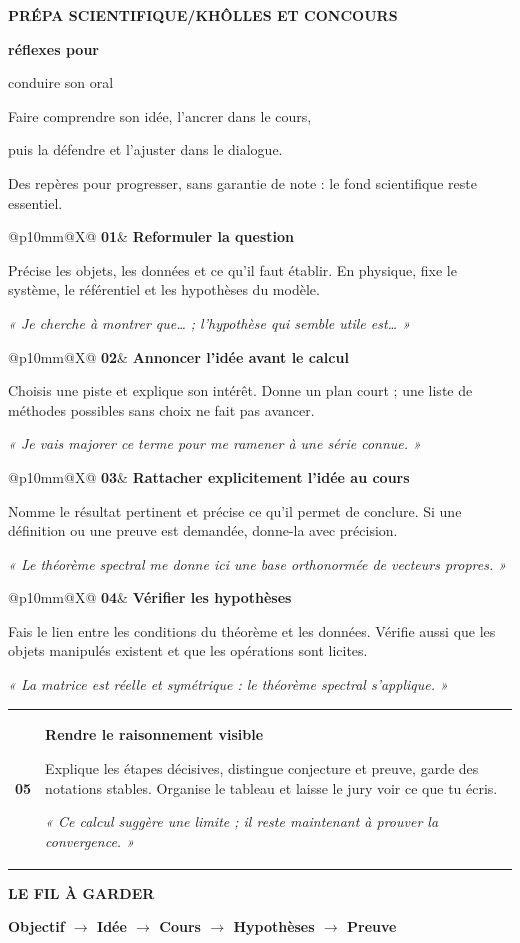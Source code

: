 \documentclass[11pt,a4paper]{article}
\makeatletter
\newcommand{\repere}[4]{%
  \begin{minipage}{\linewidth}
  \begin{tabularx}{\linewidth}{@{}p{10mm}@{\hspace{3mm}}X@{}}
  {\sffamily\bfseries\fontsize{20}{22}\selectfont\color{teal}#1}&
  {\sffamily\bfseries\large\color{ink}#2}\par\vspace{2mm}
  #3\par\vspace{1mm}
  {\small\color{teal}\textit{#4}}
  \end{tabularx}
  \end{minipage}\par\vspace{4.3mm}}
\newcommand{\bandeau}[2]{%
  \begingroup\setlength{\fboxsep}{4mm}%
  \colorbox{wash}{\parbox{\dimexpr\linewidth-8mm\relax}{%
  {\sffamily\bfseries\color{ink}#1}\par\vspace{2mm}#2}}%
  \endgroup}
\makeatother
\begin{document}
\color{ink}
{\sffamily\bfseries\small\color{teal}PRÉPA SCIENTIFIQUE\enspace /\enspace KHÔLLES ET CONCOURS}\par
\vspace{3mm}
{\sffamily\bfseries\fontsize{27}{30} réflexes pour\par conduire son oral}\par
\vspace{3mm}
{\large Faire comprendre son idée, l'ancrer dans le cours,\par puis la défendre et l'ajuster dans le dialogue.}\par
\vspace{3mm}
{\small\color{muted}Des repères pour progresser, sans garantie de note : le fond scientifique reste essentiel.}
\par\vspace{5mm}

\repere{01}{Reformuler la question}
{Précise les objets, les données et ce qu'il faut établir. En physique, fixe le système, le référentiel et les hypothèses du modèle.}
{« Je cherche à montrer que… ; l'hypothèse qui semble utile est… »}

\repere{02}{Annoncer l'idée avant le calcul}
{Choisis une piste et explique son intérêt. Donne un plan court ; une liste de méthodes possibles sans choix ne fait pas avancer.}
{« Je vais majorer ce terme pour me ramener à une série connue. »}

\repere{03}{Rattacher explicitement l'idée au cours}
{Nomme le résultat pertinent et précise ce qu'il permet de conclure. Si une définition ou une preuve est demandée, donne-la avec précision.}
{« Le théorème spectral me donne ici une base orthonormée de vecteurs propres. »}

\repere{04}{Vérifier les hypothèses}
{Fais le lien entre les conditions du théorème et les données. Vérifie aussi que les objets manipulés existent et que les opérations sont licites.}
{« La matrice est réelle et symétrique : le théorème spectral s'applique. »}

\repere{05}{Rendre le raisonnement visible}
{Explique les étapes décisives, distingue conjecture et preuve, garde des notations stables. Organise le tableau et laisse le jury voir ce que tu écris.}
{« Ce calcul suggère une limite ; il reste maintenant à prouver la convergence. »}

\vfill
\bandeau{LE FIL À GARDER}{%
\centering\sffamily\bfseries\large
Objectif $\longrightarrow$ Idée $\longrightarrow$ Cours $\longrightarrow$ Hypothèses $\longrightarrow$ Preuve}
\end{document}
